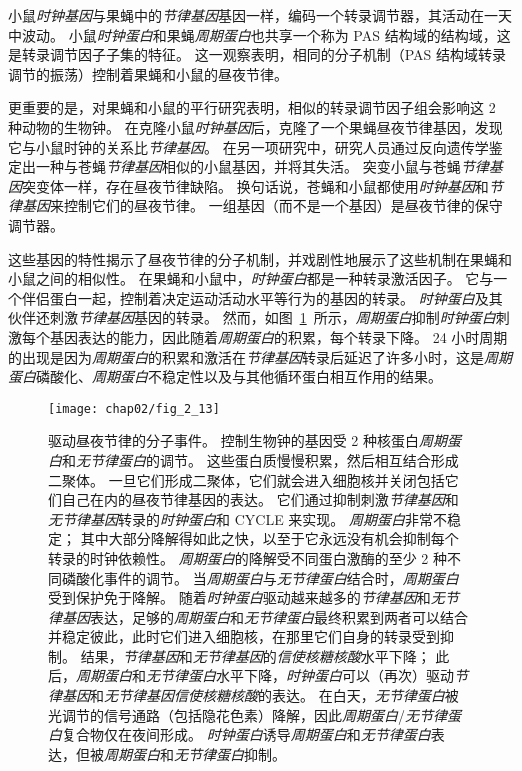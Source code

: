 小鼠\textit{时钟基因}与果蝇中的\textit{节律基因}基因一样，编码一个转录调节器，其活动在一天中波动。
小鼠\textit{时钟蛋白}和果蝇\textit{周期蛋白}也共享一个称为 PAS 结构域的结构域，这是转录调节因子子集的特征。
这一观察表明，相同的分子机制（PAS 结构域转录调节的振荡）控制着果蝇和小鼠的昼夜节律。


更重要的是，对果蝇和小鼠的平行研究表明，相似的转录调节因子组会影响这 2 种动物的生物钟。
在克隆小鼠\textit{时钟基因}后，克隆了一个果蝇昼夜节律基因，发现它与小鼠时钟的关系比\textit{节律基因}。
在另一项研究中，研究人员通过反向遗传学鉴定出一种与苍蝇\textit{节律基因}相似的小鼠基因，并将其失活。
突变小鼠与苍蝇\textit{节律基因}突变体一样，存在昼夜节律缺陷。
换句话说，苍蝇和小鼠都使用\textit{时钟基因}和\textit{节律基因}来控制它们的昼夜节律。
一组基因（而不是一个基因）是昼夜节律的保守调节器。


这些基因的特性揭示了昼夜节律的分子机制，并戏剧性地展示了这些机制在果蝇和小鼠之间的相似性。
在果蝇和小鼠中，\textit{时钟蛋白}都是一种转录激活因子。 
它与一个伴侣蛋白一起，控制着决定运动活动水平等行为的基因的转录。
\textit{时钟蛋白}及其伙伴还刺激\textit{节律基因}基因的转录。
然而，如图~\ref{fig:2_13}~所示，\textit{周期蛋白}抑制\textit{时钟蛋白}刺激每个基因表达的能力，因此随着\textit{周期蛋白}的积累，每个转录下降。
24 小时周期的出现是因为\textit{周期蛋白}的积累和激活在\textit{节律基因}转录后延迟了许多小时，这是\textit{周期蛋白}磷酸化、\textit{周期蛋白}不稳定性以及与其他循环蛋白相互作用的结果。



\begin{figure}[htbp]
	\centering
	\texttt{[image: chap02/fig\_2\_13]}
	\caption{驱动昼夜节律的分子事件。
		控制生物钟的基因受 2 种核蛋白\textit{周期蛋白}和\textit{无节律蛋白}的调节。
		这些蛋白质慢慢积累，然后相互结合形成二聚体。
		一旦它们形成二聚体，它们就会进入细胞核并关闭包括它们自己在内的昼夜节律基因的表达。
		它们通过抑制刺激\textit{节律基因}和\textit{无节律基因}转录的\textit{时钟蛋白}和 CYCLE 来实现。
		\textit{周期蛋白}非常不稳定；
		其中大部分降解得如此之快，以至于它永远没有机会抑制每个转录的时钟依赖性。 
		\textit{周期蛋白}的降解受不同蛋白激酶的至少 2 种不同磷酸化事件的调节。
		当\textit{周期蛋白}与\textit{无节律蛋白}结合时，\textit{周期蛋白}受到保护免于降解。 
		随着\textit{时钟蛋白}驱动越来越多的\textit{节律基因}和\textit{无节律基因}表达，足够的\textit{周期蛋白}和\textit{无节律蛋白}最终积累到两者可以结合并稳定彼此，此时它们进入细胞核，在那里它们自身的转录受到抑制。
		结果，\textit{节律基因}和\textit{无节律基因}的\textit{信使核糖核酸}水平下降；
		此后，\textit{周期蛋白}和\textit{无节律蛋白}水平下降，\textit{时钟蛋白}可以（再次）驱动\textit{节律基因}和\textit{无节律基因}\textit{信使核糖核酸}的表达。
		在白天，\textit{无节律蛋白}被光调节的信号通路（包括隐花色素）降解，因此\textit{周期蛋白}/\textit{无节律蛋白}复合物仅在夜间形成。
		\textit{时钟蛋白}诱导\textit{周期蛋白}和\textit{无节律蛋白}表达，但被\textit{周期蛋白}和\textit{无节律蛋白}抑制。}
	\label{fig:2_13}
\end{figure}


